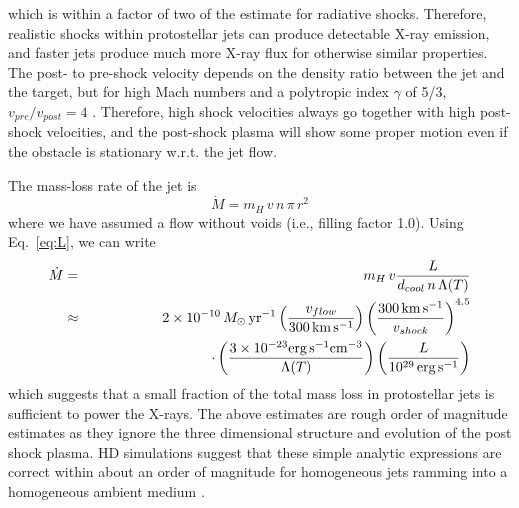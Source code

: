 which is within a factor of two of the \citet{Raga_2002} estimate for radiative shocks. Therefore, realistic shocks within protostellar jets can produce detectable X-ray emission, and faster jets produce much more X-ray flux for otherwise similar properties. The post- to pre-shock velocity depends on the density ratio between the jet and the target, but 
for high Mach numbers and a  polytropic index $\gamma$ of 5/3, $v_{pre}/v_{post}=4$ \citep{Draine_1993}. Therefore, high shock velocities always go together with high post-shock velocities, and the post-shock plasma will show some proper motion even if the obstacle is stationary w.r.t. the jet flow.


The mass-loss rate of the jet is 
\begin{equation}
\dot{M} = m_H\,v\,n\,\pi\,r^2
\end{equation}
where we have assumed a flow without voids (i.e., filling factor 1.0). Using Eq.~\ref{eq:L}, 
we can write
\begin{eqnarray}
\dot{M} & = &  m_H\,v \frac{L}{d_{cool}\, n\,\Lambda(T)}\\%
        & \approx & 2\times10^{-10} \,M_\odot\,\textrm{yr}^{-1} \left( \frac{v_{flow}}{300\,\textrm{km}\,\textrm{s}^{-1}} \right) \left( \frac{300\,\textrm{km}\,\textrm{s}^{-1}}{v_{shock}} \right)^{4.5} \nonumber \\
        && \hspace*{3cm}\cdot \left(\frac{3\times10^{-23} \textrm{erg}\, \textrm{s}^{-1} \textrm{cm}^{-3}}{\Lambda(T)}\right)  \left( \frac{L}{10^{29}\,\textrm{erg}\,\textrm{s}^{-1}} \right)
\end{eqnarray}
which suggests that a small fraction of the total mass loss in protostellar jets is sufficient to power the X-rays. 
The above estimates are rough order of magnitude estimates as they ignore the three dimensional structure and evolution of the post shock plasma. HD simulations suggest that these simple analytic expressions are correct within about an order of magnitude for homogeneous jets ramming into a homogeneous ambient medium \cite{Raga_2002}. 

